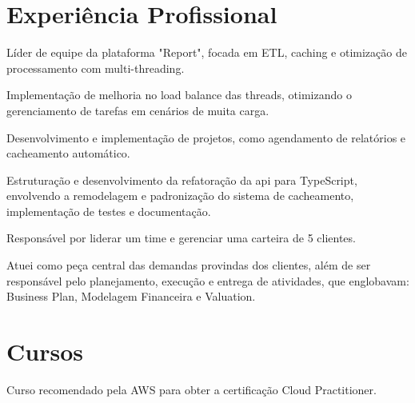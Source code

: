 \documentclass[]{deedy-resume-openfont}
\begin{document}
\begin{minipage}[t]{0.63\textwidth} 


\section{Experiência Profissional}
\vspace{\topsep} %
\begin{tightemize}
\item Líder de equipe da plataforma "Report", focada em ETL, caching e otimização de processamento com multi-threading.
\item Implementação de melhoria no load balance das threads, otimizando o gerenciamento de tarefas em cenários de muita carga.
\item Desenvolvimento e implementação de projetos, como agendamento de relatórios e cacheamento automático.
\item Estruturação e desenvolvimento da refatoração da api para TypeScript, envolvendo a remodelagem e padronização do sistema de cacheamento, implementação de testes e documentação.
\end{tightemize}
\sectionsep

\begin{tightemize}
\item Responsável por liderar um time e gerenciar uma carteira de 5 clientes.
\item Atuei como peça central das demandas provindas dos clientes, além de ser responsável pelo planejamento, execução e entrega de atividades, que englobavam: Business Plan, Modelagem Financeira e Valuation.
\end{tightemize}
\sectionsep

\section{Cursos}
\begin{tightemize}
\item Curso recomendado pela AWS para obter a certificação Cloud Practitioner.
\end{tightemize}
\sectionsep


\end{minipage}
\end{document}
